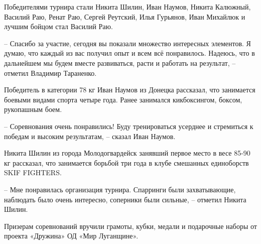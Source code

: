Победителями турнира стали Никита Шилин, Иван Наумов,  Никита Калюжный, Василий
Раю, Ренат Раю, Сергей Реутский, Илья Гурьянов, Иван Михайлюк и лучшим бойцом
стал Василий Раю.

– Спасибо за участие, сегодня вы показали множество интересных элементов. Я
думаю, что каждый из вас получил опыт и всем всё понравилось. Надеюсь, что в
дальнейшем мы будем вместе развиваться, расти и работать на результат, –
отметил Владимир Тараненко.

Победитель в категории 78 кг Иван Наумов из Донецка рассказал, что занимается
боевыми видами спорта четыре года. Ранее занимался кикбоксингом, боксом,
рукопашным боем.

– Соревнования очень понравились! Буду тренироваться усерднее и стремиться к
победам и высоким результатам, – сказал Иван Наумов.

Никита Шилин из города Молодогвардейск занявший первое место в весе 85-90 кг
рассказал, что занимается борьбой три года в клубе смешанных единоборств SKIF
FIGHTERS.

– Мне понравилась организация турнира. Спарринги были захватывающие, наблюдать
было очень интересно, соперники были сильные,  – отметил Никита Шилин.

Призерам соревнований вручили грамоты, кубки, медали и подарочные наборы от
проекта «Дружина» ОД «Мир Луганщине».
